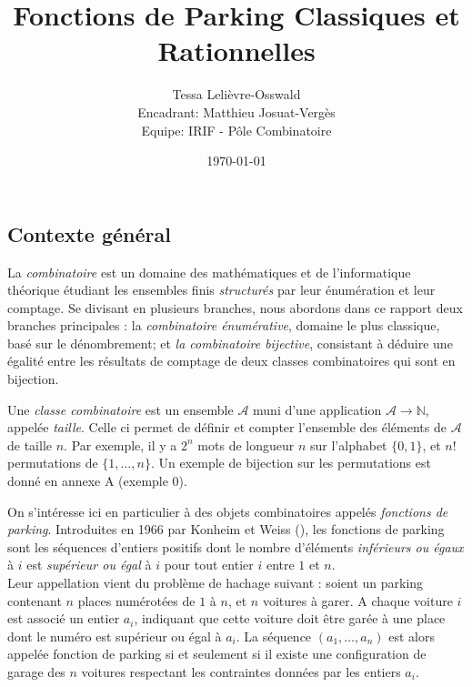 \documentclass[11pt]{article}
\theoremstyle{remark}
\theoremstyle{definition}
\begin{document}
\title{Fonctions de Parking Classiques et Rationnelles}
\author{Tessa Lelièvre-Osswald\\
    {\small Encadrant: Matthieu Josuat-Vergès}\\
    {\small Equipe: IRIF - Pôle Combinatoire}}
\date{\today}

\maketitle

\subsection*{Contexte général}

La \emph{combinatoire} est un domaine des mathématiques et de 
l'informatique théorique étudiant les ensembles finis \emph{structurés}
par leur énumération et leur comptage.
Se divisant en plusieurs branches, nous abordons dans ce rapport deux
branches principales : la \emph{combinatoire énumérative}, domaine le plus
classique, basé sur le dénombrement; et \emph{la combinatoire bijective},
consistant à déduire une égalité entre les résultats de comptage de deux
classes combinatoires qui sont en bijection.

Une \emph{classe combinatoire} est un ensemble $\mathcal{A}$ muni d'une
application $\mathcal{A} \to \mathbb{N}$, appelée \emph{taille}. 
Celle ci permet de définir et compter l'ensemble des éléments de
$\mathcal{A}$ de taille $n$.
Par exemple, il y a $2^n$ mots de longueur $n$ sur l'alphabet $\{0,1\}$,
et $n!$ permutations de $\{1, \ldots, n\}$.
Un exemple de bijection sur les permutations est donné en annexe A
(exemple 0). 

On s'intéresse ici en particulier à des objets combinatoires appelés
\emph{fonctions de parking}. Introduites en 1966 par Konheim et Weiss
(\cite{ref1}), les fonctions de parking sont les séquences d'entiers
positifs dont le nombre d'éléments \emph{inférieurs ou égaux} à $i$ est
\emph{supérieur ou égal} à $i$ pour tout entier $i$ entre $1$ et $n$.\\
Leur appellation vient du problème de hachage suivant :
soient un parking contenant $n$ places numérotées de $1$ à $n$, et $n$
voitures à garer.
A chaque voiture $i$ est associé un entier $a_i$, indiquant que cette
voiture doit être garée à une place dont le numéro est supérieur ou égal
à $a_i$.
La séquence $(a_1, \ldots, a_n)$ est alors appelée fonction de parking si
et seulement si il existe une configuration de garage des $n$ voitures
respectant les contraintes données par les entiers $a_i$.
\end{document}
